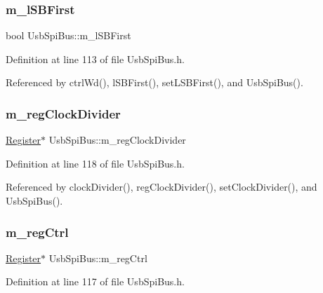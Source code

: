 \subsubsection{\texorpdfstring{m\+\_\+l\+S\+B\+First}{m\_lSBFirst}}
{\footnotesize\ttfamily bool Usb\+Spi\+Bus\+::m\+\_\+l\+S\+B\+First\hspace{0.3cm}{\ttfamily [private]}}



Definition at line 113 of file Usb\+Spi\+Bus.\+h.



Referenced by ctrl\+Wd(), l\+S\+B\+First(), set\+L\+S\+B\+First(), and Usb\+Spi\+Bus().

\mbox{\label{classUsbSpiBus_abfd5f040a0a8c19d972b26ea581bf1f0}} 
\subsubsection{\texorpdfstring{m\+\_\+reg\+Clock\+Divider}{m\_regClockDivider}}
{\footnotesize\ttfamily \hyperlink{classRegister}{Register}$\ast$ Usb\+Spi\+Bus\+::m\+\_\+reg\+Clock\+Divider\hspace{0.3cm}{\ttfamily [private]}}



Definition at line 118 of file Usb\+Spi\+Bus.\+h.



Referenced by clock\+Divider(), reg\+Clock\+Divider(), set\+Clock\+Divider(), and Usb\+Spi\+Bus().

\mbox{\label{classUsbSpiBus_abcd2ac59f2bb4ea5b97ff98f2b7659da}} 
\subsubsection{\texorpdfstring{m\+\_\+reg\+Ctrl}{m\_regCtrl}}
{\footnotesize\ttfamily \hyperlink{classRegister}{Register}$\ast$ Usb\+Spi\+Bus\+::m\+\_\+reg\+Ctrl\hspace{0.3cm}{\ttfamily [private]}}



Definition at line 117 of file Usb\+Spi\+Bus.\+h.



